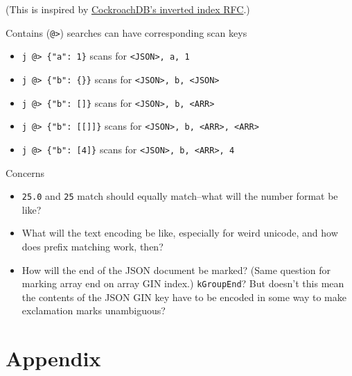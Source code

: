 \documentclass[11pt]{article}
\providecommand{\tightlist}{%
  \setlength{\itemsep}{0pt}\setlength{\parskip}{0pt}}
\begin{document}
(This is inspired by
\href{https://github.com/cockroachdb/cockroach/blob/master/docs/RFCS/20171020_inverted_indexes.md}{CockroachDB's
inverted index RFC}.)

Contains (\texttt{@\textgreater{}}) searches can have corresponding scan
keys

\begin{itemize}
\tightlist
\item
  \texttt{j\ @\textgreater{}\ \textquotesingle{}\{"a":\ 1\}\textquotesingle{}}
  scans for \texttt{\textless{}JSON\textgreater{},\ a,\ 1}
\item
  \texttt{j\ @\textgreater{}\ \textquotesingle{}\{"b":\ \{\}\}\textquotesingle{}}
  scans for
  \texttt{\textless{}JSON\textgreater{},\ b,\ \textless{}JSON\textgreater{}}
\item
  \texttt{j\ @\textgreater{}\ \textquotesingle{}\{"b":\ {[}{]}\}\textquotesingle{}}
  scans for
  \texttt{\textless{}JSON\textgreater{},\ b,\ \textless{}ARR\textgreater{}}
\item
  \texttt{j\ @\textgreater{}\ \textquotesingle{}\{"b":\ {[}{[}{]}{]}\}\textquotesingle{}}
  scans for
  \texttt{\textless{}JSON\textgreater{},\ b,\ \textless{}ARR\textgreater{},\ \textless{}ARR\textgreater{}}
\item
  \texttt{j\ @\textgreater{}\ \textquotesingle{}\{"b":\ {[}4{]}\}\textquotesingle{}}
  scans for
  \texttt{\textless{}JSON\textgreater{},\ b,\ \textless{}ARR\textgreater{},\ 4}
\end{itemize}

Concerns

\begin{itemize}
\tightlist
\item
  \texttt{25.0} and \texttt{25} match should equally match--what will
  the number format be like?
\item
  What will the text encoding be like, especially for weird unicode, and
  how does prefix matching work, then?
\item
  How will the end of the JSON document be marked? (Same question for
  marking array end on array GIN index.) \texttt{kGroupEnd}? But doesn't
  this mean the contents of the JSON GIN key have to be encoded in some
  way to make exclamation marks unambiguous?
\end{itemize}

\hypertarget{appendix}{%
\section{Appendix}\label{appendix}}
\end{document}
